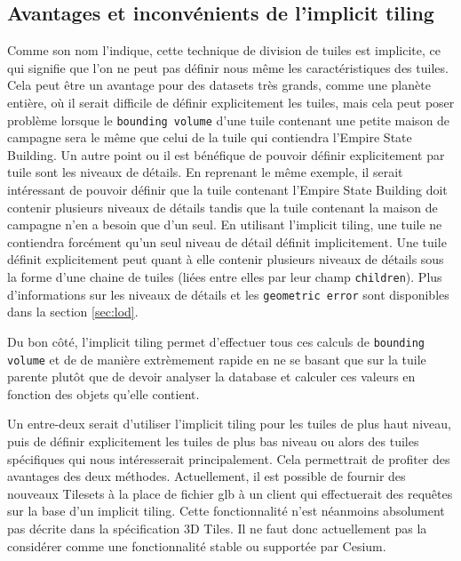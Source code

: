 \newpage
\subsection{Avantages et inconvénients de l'implicit tiling}

Comme son nom l'indique, cette technique de division de tuiles est implicite, ce qui signifie que l'on ne peut pas définir nous même les caractéristiques des tuiles. Cela peut être un avantage pour des datasets très grands, comme une planète entière, où il serait difficile de définir explicitement les tuiles, mais cela peut poser problème lorsque le \texttt{bounding volume} d'une tuile contenant une petite maison de campagne sera le même que celui de la tuile qui contiendra l'Empire State Building. Un autre point ou il est bénéfique de pouvoir définir explicitement par tuile sont les niveaux de détails. En reprenant le même exemple, il serait intéressant de pouvoir définir que la tuile contenant l'Empire State Building doit contenir plusieurs niveaux de détails tandis que la tuile contenant la maison de campagne n'en a besoin que d'un seul. En utilisant l'implicit tiling, une tuile ne contiendra forcément qu'un seul niveau de détail définit implicitement. Une tuile définit explicitement peut quant à elle contenir plusieurs niveaux de détails sous la forme d'une chaine de tuiles (liées entre elles par leur champ \texttt{children}). Plus d'informations sur les niveaux de détails et les \texttt{geometric error} sont disponibles dans la section \ref{sec:lod}.


Du bon côté, l'implicit tiling permet d'effectuer tous ces calculs de \texttt{bounding volume} et de  de manière extrèmement rapide en ne se basant que sur la tuile parente plutôt que de devoir analyser la database et calculer ces valeurs en fonction des objets qu'elle contient.

Un entre-deux serait d'utiliser l'implicit tiling pour les tuiles de plus haut niveau, puis de définir explicitement les tuiles de plus bas niveau ou alors des tuiles spécifiques qui nous intéresserait principalement. Cela permettrait de profiter des avantages des deux méthodes. Actuellement, il est possible de fournir des nouveaux Tilesets à la place de fichier glb à un client qui effectuerait des requêtes sur la base d'un implicit tiling. Cette fonctionnalité n'est néanmoins absolument pas décrite dans la spécification 3D Tiles. Il ne faut donc actuellement pas la considérer comme une fonctionnalité stable ou supportée par Cesium.

